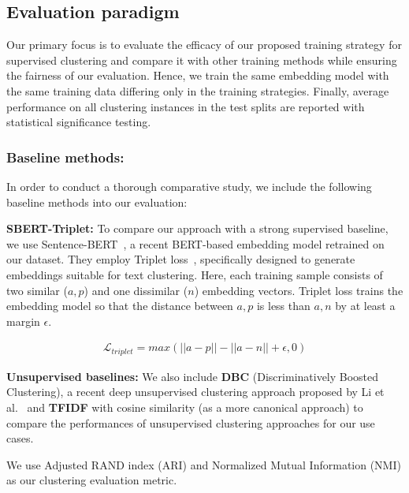 \documentclass[11pt,a4paper]{article}
\begin{document}
\subsection{Evaluation paradigm} Our primary focus is to evaluate the efficacy of our proposed training strategy for supervised clustering and compare it with other training methods while ensuring the fairness of our evaluation. Hence, we train the same embedding model with the same training data differing only in the training strategies. Finally, average performance on all clustering instances in the test splits are reported with statistical significance testing. 

\subsubsection{Baseline methods:} In order to conduct a thorough comparative study, we include the following baseline methods into our evaluation:

\textbf{SBERT-Triplet:} To compare our approach with a strong supervised baseline, we use Sentence-BERT~\cite{reimers2019sentence}, a recent BERT-based embedding model retrained on our dataset. They employ Triplet loss~\cite{dor2018learning}, specifically designed to generate embeddings suitable for text clustering. Here, each training sample consists of two similar ($a,p$) and one dissimilar ($n$) embedding vectors. Triplet loss trains the embedding model so that the distance between $a,p$ is less than $a,n$ by at least a margin $\epsilon$.

\begin{align*}
    \mathcal{L}_{triplet} = max(||a-p||-||a-n||+\epsilon, 0)
\end{align*}


\textbf{Unsupervised baselines:} We also include \textbf{DBC} (Discriminatively Boosted Clustering), a recent deep unsupervised clustering approach proposed by Li et al.~\cite{li2018discriminatively} and \textbf{TFIDF} with cosine similarity (as a more canonical approach) to compare the performances of unsupervised clustering approaches for our use cases.

We use Adjusted RAND index (ARI) and Normalized Mutual Information (NMI) as our clustering evaluation metric.
\end{document}
